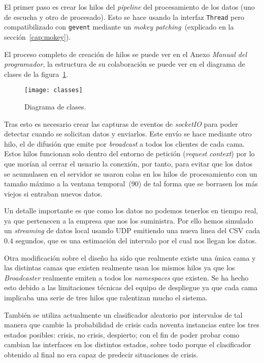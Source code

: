 El primer paso es crear los hilos del \textit{pipeline} del procesamiento de los datos (uno de escucha y otro de procesado). Esto se hace usando la interfaz \texttt{Thread} pero compatibilizado con \texttt{gevent} mediante un \textit{mokey patching}~(explicado en la sección~\ref{cap:mokey}).

El proceso completo de creación de hilos se puede ver en el Anexo \textit{Manual del programador}, la estructura de su colaboración se puede ver en el diagrama de clases de la figura~\ref{fig:classes}.

\begin{figure}
	\centering
	\texttt{[image: classes]}
	\caption{Diagrama de clases.}
	\label{fig:classes}
\end{figure}

Tras esto es necesario crear las capturas de eventos de \textit{socketIO} para poder detectar cuando se solicitan datos y enviarlos. Este envío se hace mediante otro hilo, el de difusión que emite por \textit{broadcast} a todos los clientes de cada cama. Estos hilos funcionan solo dentro del entorno de petición (\textit{request context}) por lo que morían al cerrar el usuario la conexión, por tanto, para evitar que los datos se acumulasen en el servidor se usaron colas en los hilos de procesamiento con un tamaño máximo a la ventana temporal~(90) de tal forma que se borrasen los más viejos si entraban nuevos datos.

Un detalle importante es que como los datos no podemos tenerlos en tiempo real, ya que pertenecen a la empresa que nos los suministra. Por ello hemos simulado un \textit{streaming} de datos local usando UDP emitiendo una nueva linea del CSV cada $0.4$ segundos, que es una estimación del intervalo por el cual nos llegan los datos.

Otra modificación sobre el diseño ha sido que realmente existe una única cama y las distintas camas que existen realmente usan los mismos hilos ya que los \textit{Broadcaster} realmente emiten a todos los \textit{namespaces} que existen. Se ha hecho esto debido a las limitaciones técnicas del equipo de despliegue ya que cada cama implicaba una serie de tres hilos que ralentizan mucho el sistema.

También se utiliza actualmente un clasificador aleatorio por intervalos de tal manera que cambie la probabilidad de crisis cada noventa instancias entre los tres estados posibles: crisis, no crisis, despierto; con el fin de poder probar como cambian las interfaces en los distintos estados, sobre todo porque el clasificador obtenido al final no era capaz de predecir situaciones de crisis.

